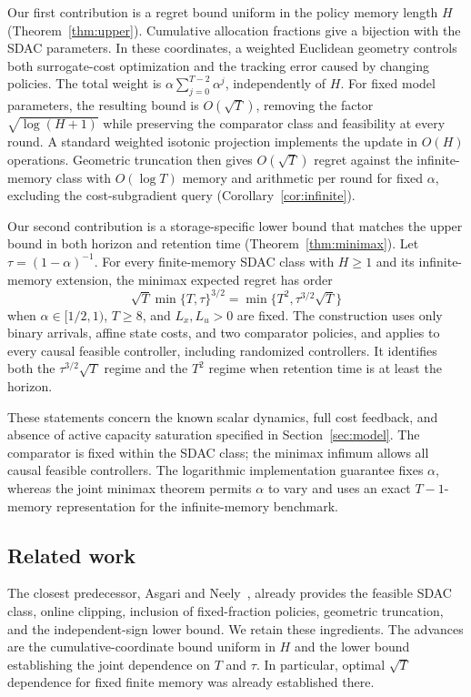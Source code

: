 \documentclass[11pt]{article}
\begin{document}
Our first contribution is a regret bound uniform in the policy memory
length $H$ (Theorem~\ref{thm:upper}). Cumulative allocation fractions
give a bijection with the SDAC parameters. In these coordinates, a
weighted Euclidean geometry controls both surrogate-cost optimization
and the tracking error caused by changing policies. The total weight
is $\alpha\sum_{j=0}^{T-2}\alpha^j$, independently of $H$.
For fixed model parameters, the resulting bound is $O(\sqrt T)$,
removing the factor $\sqrt{\log(H+1)}$ while preserving the comparator
class and feasibility at every round. A standard weighted isotonic
projection implements the update in $O(H)$ operations.
Geometric truncation then gives $O(\sqrt T)$ regret against the
infinite-memory class with $O(\log T)$ memory and arithmetic per round
for fixed $\alpha$, excluding the cost-subgradient query
(Corollary~\ref{cor:infinite}).

Our second contribution is a storage-specific lower bound that
matches the upper bound in both horizon and retention time
(Theorem~\ref{thm:minimax}). Let $\tau=(1-\alpha)^{-1}$.
For every finite-memory SDAC class with $H\ge1$ and its
infinite-memory extension, the minimax expected regret has order
\[
\sqrt T\min\{T,\tau\}^{3/2}
=
\min\{T^2,\tau^{3/2}\sqrt T\}
\]
when $\alpha\in[1/2,1)$, $T\ge8$, and $L_x,L_u>0$ are fixed.
The construction uses only binary arrivals, affine state costs, and
two comparator policies, and applies to every causal feasible
controller, including randomized controllers. It identifies both the
$\tau^{3/2}\sqrt T$ regime and the $T^2$ regime when retention time
is at least the horizon.

These statements concern the known scalar dynamics, full cost feedback,
and absence of active capacity saturation specified in
Section~\ref{sec:model}. The comparator is fixed within the SDAC class;
the minimax infimum allows all causal feasible controllers. The
logarithmic implementation guarantee fixes $\alpha$, whereas the joint
minimax theorem permits $\alpha$ to vary and uses an exact
$T-1$-memory representation for the infinite-memory benchmark.

\subsection{Related work}

The closest predecessor, Asgari and Neely~\cite{asgari2026sdac},
already provides the feasible SDAC class, online clipping, inclusion
of fixed-fraction policies, geometric truncation, and the
independent-sign lower bound. We retain these ingredients. The advances
are the cumulative-coordinate bound uniform in $H$ and the lower
bound establishing the joint dependence on $T$ and $\tau$.
In particular, optimal $\sqrt T$ dependence for fixed finite memory
was already established there.
\end{document}
